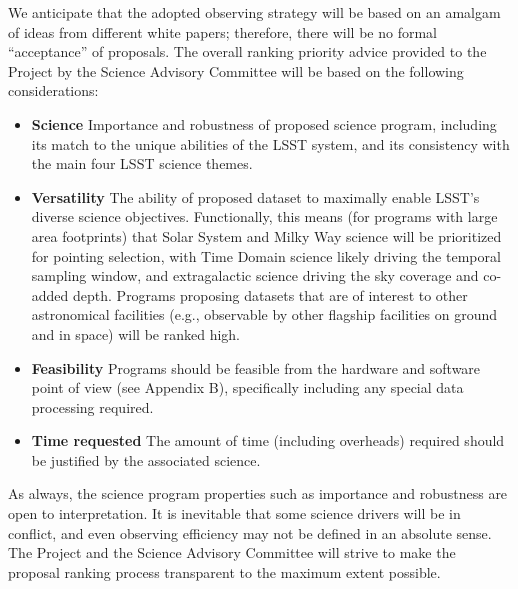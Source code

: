 \documentclass[DM,lsstdraft,toc,usenatbib]{lsstdoc}
\begin{document}
We anticipate that the adopted observing strategy will be based on an amalgam of ideas from 
different white papers; therefore, there will be no formal ``acceptance'' of proposals. The
overall ranking priority advice provided to the Project by the Science Advisory Committee 
will be based on the following considerations: 
\begin{itemize}
\item {\bf Science} Importance and robustness of proposed science program, including 
           its match to the unique abilities of the LSST system, and its consistency with the 
           main four LSST science themes. 
\item {\bf Versatility} The ability of proposed dataset to maximally enable LSST's diverse science objectives. 
          Functionally, this means (for programs with large area footprints) that Solar System and Milky Way science will be prioritized for pointing selection,
          with Time Domain science likely driving the temporal sampling window, and extragalactic science driving 
          the sky coverage and co-added depth. Programs proposing datasets that are of interest to other astronomical 
          facilities (e.g., observable by other flagship facilities on ground and in space) will be ranked high. 
\item {\bf Feasibility} Programs should be feasible from the hardware and software point of view (see Appendix B),
         specifically including any special data processing required.
\item {\bf Time requested} The amount of time (including overheads) required should be justified by 
        the associated science. 
\end{itemize} 

As always, the science program properties such as importance and robustness are open
to interpretation. It is inevitable that some science drivers will be in conflict, and even
observing efficiency may not be defined in an absolute sense. The Project and the Science Advisory 
Committee will strive to make the proposal ranking process transparent to the maximum extent possible. 
\end{document}
